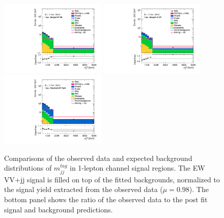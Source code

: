 \begin{figure}[]
    \centering
    \includegraphics[width=0.45\textwidth]{figures/PostFit/Region_disttagMjj_DSRVBSHP_BMin0_J0_incJet1_L1_T0_incFat1_Y6051_incTag1_Fat1_GlobalFit_unconditionnal_mu1log.pdf}
    \includegraphics[width=0.45\textwidth]{figures/PostFit/Region_disttagMjj_DSRVBSLP_BMin0_J0_incJet1_L1_T0_incFat1_Y6051_incTag1_Fat1_GlobalFit_unconditionnal_mu1log.pdf}
    \includegraphics[width=0.45\textwidth]{figures/PostFit/Region_disttagMjj_DSRVBSTight_BMin0_T0_Y6051_incTag1_J2_L1_incJet1_GlobalFit_unconditionnal_mu1log.pdf}
      \caption{Comparisons of the observed data and expected background distributions of $m^{tag}_{jj}$ in 1-lepton channel signal regions. The EW VV+jj signal is filled on top of the fitted backgrounds, normalized to the signal yield extracted from the observed data ($\mu = 0.98$). The bottom panel shows the ratio of the observed data to the post fit signal and background predictions.}
      \label{fig:postSR1lepmtagjj}
\end{figure}

